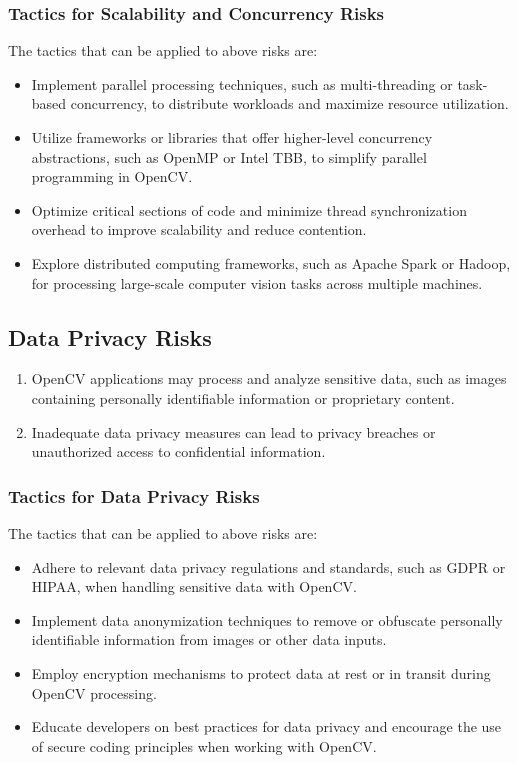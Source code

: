  \subsubsection{Tactics for Scalability and Concurrency Risks \label{subsubSection::ScalabilityTactic}}
The tactics that can be applied to above risks are:
\begin{itemize}
     \item Implement parallel processing techniques, such as multi-threading or task-based concurrency, to distribute workloads and maximize resource utilization.
     \item Utilize frameworks or libraries that offer higher-level concurrency abstractions, such as OpenMP or Intel TBB, to simplify parallel programming in OpenCV.
     \item Optimize critical sections of code and minimize thread synchronization overhead to improve scalability and reduce contention.
     \item Explore distributed computing frameworks, such as Apache Spark or Hadoop, for processing large-scale computer vision tasks across multiple machines.
\end{itemize}

\subsection{Data Privacy Risks \label{subSection::PrivacyRisk}}
\begin{enumerate}
     \item OpenCV applications may process and analyze sensitive data, such as images containing personally identifiable information or proprietary content.
     \item Inadequate data privacy measures can lead to privacy breaches or unauthorized access to confidential information.
 \end{enumerate}

 \subsubsection{Tactics for Data Privacy Risks \label{subsubSection::PrivacyTactic}}
The tactics that can be applied to above risks are:
\begin{itemize}
     \item Adhere to relevant data privacy regulations and standards, such as GDPR or HIPAA, when handling sensitive data with OpenCV.
     \item Implement data anonymization techniques to remove or obfuscate personally identifiable information from images or other data inputs.
     \item Employ encryption mechanisms to protect data at rest or in transit during OpenCV processing.
     \item Educate developers on best practices for data privacy and encourage the use of secure coding principles when working with OpenCV.
\end{itemize}

